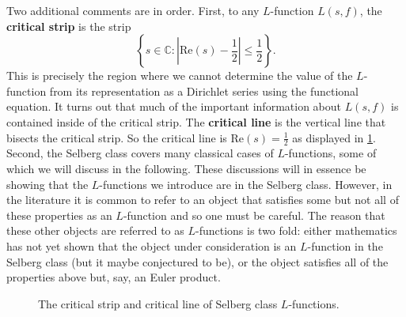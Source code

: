 \documentclass[12pt]{book}
\theoremstyle{definition}\newframedtheorem{method}{Method}
\newcommand{\C}{\mathbb{C}}
\newcommand{\<}{\langle}
\renewcommand{\>}{\rangle}
\renewcommand{\Re}{\mathrm{Re}}
\begin{document}
      Two additional comments are in order. First, to any $L$-function $L(s,f)$, the \textbf{critical strip} is the strip
      \[
        \left\{s \in \C:\left|\Re(s)-\frac{1}{2}\right| \le \frac{1}{2}\right\}.
      \]
      This is precisely the region where we cannot determine the value of the $L$-function from its representation as a Dirichlet series using the functional equation. It turns out that much of the important information about $L(s,f)$ is contained inside of the critical strip. The \textbf{critical line} is the vertical line that bisects the critical strip. So the critical line is $\Re(s) = \frac{1}{2}$ as displayed in \cref{fig:critical_strip}. Second, the Selberg class covers many classical cases of $L$-functions, some of which we will discuss in the following. These discussions will in essence be showing that the $L$-functions we introduce are in the Selberg class. However, in the literature it is common to refer to an object that satisfies some but not all of these properties as an $L$-function and so one must be careful. The reason that these other objects are referred to as $L$-functions is two fold: either mathematics has not yet shown that the object under consideration is an $L$-function in the Selberg class (but it maybe conjectured to be), or the object satisfies all of the properties above but, say, an Euler product.

      \begin{figure}[ht]
        \centering
        \caption{The critical strip and critical line of Selberg class $L$-functions.}
        \label{fig:critical_strip}
      \end{figure}
\end{document}

